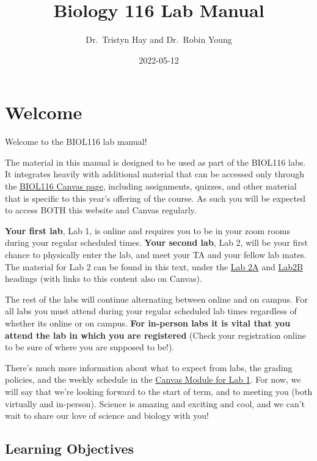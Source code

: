 \documentclass[
]{book}
\title{Biology 116 Lab Manual}
\author{Dr.~Tristyn Hay and Dr.~Robin Young}
\date{2022-05-12}
\begin{document}
\maketitle

{
\setcounter{tocdepth}{1}
\tableofcontents
}
\hypertarget{welcome}{%
\chapter*{Welcome}\label{welcome}}

Welcome to the BIOL116 lab manual!

The material in this manual is designed to be used as part of the BIOL116 labs. It integrates heavily with additional material that can be accessed only through the \href{https://canvas.ubc.ca/courses/94572}{BIOL116 Canvas page}, including assignments, quizzes, and other material that is specific to this year's offering of the course. As such you will be expected to access BOTH this website and Canvas regularly.

\textbf{Your first lab}, Lab 1, is online and requires you to be in your zoom rooms during your regular scheduled times. \textbf{Your second lab}, Lab 2, will be your first chance to physically enter the lab, and meet your TA and your fellow lab mates. The material for Lab 2 can be found in this text, under the \href{https://ubco-biology.github.io/BIOL-116-Lab-Manual/the-process-of-science.html}{Lab 2A} and \href{https://ubco-biology.github.io/BIOL-116-Lab-Manual/research-project.html}{Lab2B} headings (with links to this content also on Canvas).

The rest of the labs will continue alternating between online and on campus. For all labs you must attend during your regular scheduled lab times regardless of whether its online or on campus. \textbf{For in-person labs it is vital that you attend the lab in which you are registered} (Check your registration online to be sure of where you are supposed to be!).

There's much more information about what to expect from labs, the grading policies, and the weekly schedule in the \href{https://canvas.ubc.ca}{Canvas Module for Lab 1}. For now, we will say that we're looking forward to the start of term, and to meeting you (both virtually and in-person). Science is amazing and exciting and cool, and we can't wait to share our love of science and biology with you!

\hypertarget{learning-objectives}{%
\section*{Learning Objectives}\label{learning-objectives}}
\end{document}
